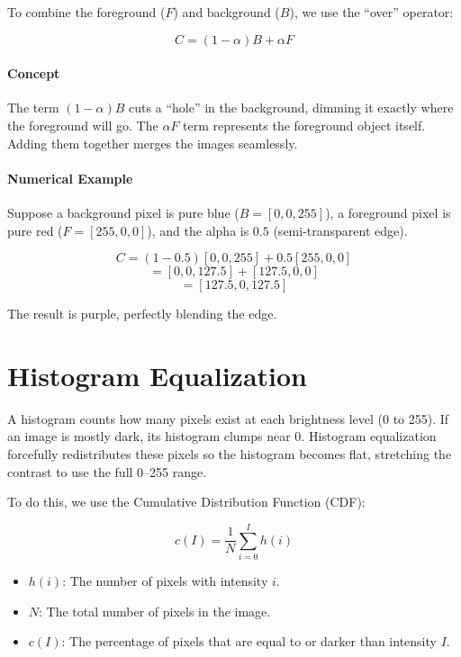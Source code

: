 \documentclass[12pt]{article}
\begin{document}
To combine the foreground ($F$) and background ($B$), we use the ``over'' operator:

\[
    C = (1 - \alpha)B + \alpha F
\]

\paragraph{Concept}

The term $(1 - \alpha)B$ cuts a ``hole'' in the background, dimming it exactly where the foreground will go. The $\alpha F$ term represents the foreground object itself. Adding them together merges the images seamlessly.

\paragraph{Numerical Example}

Suppose a background pixel is pure blue ($B = [0, 0, 255]$), a foreground pixel is pure red ($F = [255, 0, 0]$), and the alpha is $0.5$ (semi-transparent edge).

\[
    C = (1 - 0.5)[0, 0, 255] + 0.5 [255, 0, 0]
\]
\[
    = [0, 0, 127.5] + [127.5, 0, 0]
\]
\[
    = [127.5, 0, 127.5]
\]

The result is purple, perfectly blending the edge.

\section{Histogram Equalization}

A histogram counts how many pixels exist at each brightness level (0 to 255). If an image is mostly dark, its histogram clumps near 0. Histogram equalization forcefully redistributes these pixels so the histogram becomes flat, stretching the contrast to use the full 0--255 range.

To do this, we use the Cumulative Distribution Function (CDF):

\[
    c(I) = \frac{1}{N} \sum_{i=0}^{I} h(i)
\]

\begin{itemize}
    \item $h(i)$: The number of pixels with intensity $i$.
    \item $N$: The total number of pixels in the image.
    \item $c(I)$: The percentage of pixels that are equal to or darker than intensity $I$.
\end{itemize}
\end{document}
